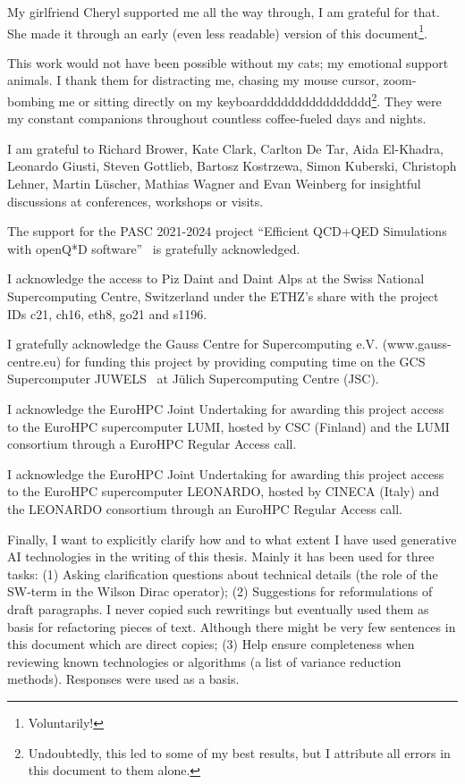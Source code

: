 My girlfriend Cheryl supported me all the way through, I am grateful for that.
She made it through an early (even less readable) version of this document\footnote{Voluntarily!}.

This work would not have been possible without my cats;
my emotional support animals.
I thank them for distracting me, chasing my mouse cursor, zoom-bombing me or sitting directly on my keyboardddddddddddddddd\footnote{Undoubtedly, this led to some of my best results, but I attribute all errors in this document to them alone.}.
They were my constant companions throughout countless coffee-fueled days and nights.

I am grateful to Richard Brower, Kate Clark, Carlton De Tar, Aida El-Khadra, Leonardo Giusti, Steven Gottlieb, Bartosz Kostrzewa, Simon Kuberski, Christoph Lehner, Martin Lüscher, Mathias Wagner and Evan Weinberg for insightful discussions at conferences, workshops or visits.

The support for the PASC 2021-2024 project ``Efficient QCD+QED Simulations with openQ*D software''~\cite{online:pasc2021} is gratefully acknowledged.

I acknowledge the access to Piz Daint and Daint Alps at the Swiss National Supercomputing Centre, Switzerland under the ETHZ’s share with the project IDs c21, ch16, eth8, go21 and s1196.

I gratefully acknowledge the Gauss Centre for Supercomputing e.V. (www.gauss-centre.eu) for funding this project by providing computing time on the GCS Supercomputer JUWELS~\cite{juwels} at Jülich Supercomputing Centre (JSC). 

I acknowledge the EuroHPC Joint Undertaking for awarding this project access to the EuroHPC supercomputer LUMI, hosted by CSC (Finland) and the LUMI consortium through a EuroHPC Regular Access call.

I acknowledge the EuroHPC Joint Undertaking for awarding this project access to the EuroHPC supercomputer LEONARDO, hosted by CINECA (Italy) and the LEONARDO consortium through an EuroHPC Regular Access call.


Finally, I want to explicitly clarify how and to what extent I have used generative AI technologies in the writing of this thesis.
Mainly it has been used for three tasks:
(1) Asking clarification questions about technical details (\eg the role of the SW-term in the Wilson Dirac operator);
(2) Suggestions for reformulations of draft paragraphs. 
I never copied such rewritings but eventually used them as basis for refactoring pieces of text.
Although there might be very few sentences in this document which are direct copies;
(3) Help ensure completeness when reviewing known technologies or algorithms (\eg a list of variance reduction methods).
Responses were used as a basis.


\endgroup

